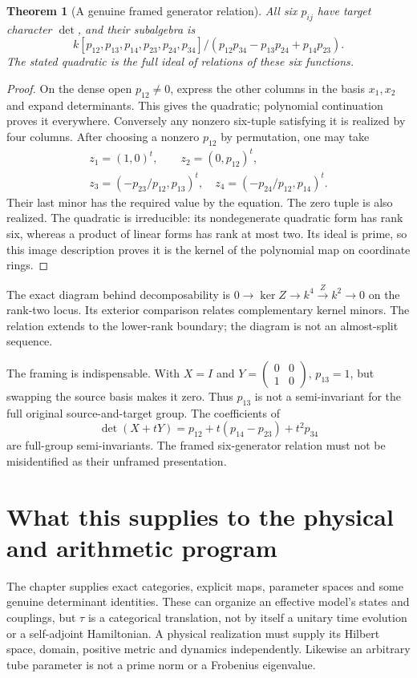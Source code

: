 \documentclass[11pt,oneside,openany]{book}
\newtheorem{theorem}{Theorem}[chapter]
\theoremstyle{definition}\newtheorem{definition}[theorem]{Definition}
\theoremstyle{remark}\newtheorem{remark}[theorem]{Remark}
\begin{document}
\begin{theorem}[A genuine framed generator relation]\label{arb:plucker}
All six $p_{ij}$ have target character $\det$, and their subalgebra is
\[
 k[p_{12},p_{13},p_{14},p_{23},p_{24},p_{34}]
 \big/(p_{12}p_{34}-p_{13}p_{24}+p_{14}p_{23}).
\]
The stated quadratic is the full ideal of relations of these six functions.
\end{theorem}
\begin{proof}
On the dense open $p_{12}\ne0$, express the other columns in the basis
$x_1,x_2$ and expand determinants. This gives the quadratic; polynomial
continuation proves it everywhere. Conversely any nonzero six-tuple
satisfying it is realized by four columns. After choosing a nonzero $p_{12}$
by permutation, one may take
\[
\begin{gathered}
 z_1=(1,0)^t,\qquad z_2=(0,p_{12})^t,\\
 z_3=(-p_{23}/p_{12},p_{13})^t,\quad
 z_4=(-p_{24}/p_{12},p_{14})^t.
\end{gathered}
\]
Their last minor has the required value by the equation. The zero tuple is
also realized. The quadratic is irreducible: its nondegenerate quadratic
form has rank six, whereas a product of linear forms has rank at most two.
Its ideal is prime, so this image description proves it is the kernel of
the polynomial map on coordinate rings.
\end{proof}
The exact diagram behind decomposability is
$0\to\ker Z\to k^4\xrightarrow Z k^2\to0$ on the rank-two locus. Its
exterior comparison relates complementary kernel minors. The relation extends
to the lower-rank boundary; the diagram is not an almost-split sequence.

The framing is indispensable. With $X=I$ and
$Y=\left(\begin{smallmatrix}0&0\\1&0\end{smallmatrix}\right)$,
$p_{13}=1$, but swapping the source basis makes it zero. Thus $p_{13}$ is
not a semi-invariant for the full original source-and-target group.
The coefficients of
\[
 \det(X+tY)=p_{12}+t(p_{14}-p_{23})+t^2p_{34}
\]
are full-group semi-invariants. The framed six-generator relation must not be
misidentified as their unframed presentation.

\section[Physical and arithmetic scope]{What this supplies to the physical and arithmetic program}
The chapter supplies exact categories, explicit maps, parameter spaces and
some genuine determinant identities. These can organize an effective model's
states and couplings, but $\tau$ is a categorical translation, not by itself
a unitary time evolution or a self-adjoint Hamiltonian. A physical realization
must supply its Hilbert space, domain, positive metric and dynamics independently.
Likewise an arbitrary tube parameter is not a prime norm or a Frobenius eigenvalue.
\end{document}
